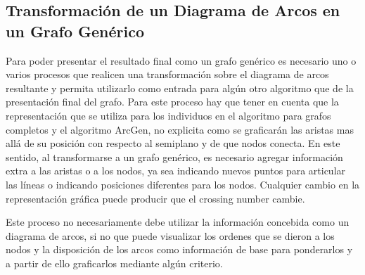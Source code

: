 \subsection{Transformación de un Diagrama de Arcos en un Grafo Genérico}
\label{sec:transformacion_generico}
Para poder presentar el resultado final como un grafo genérico es necesario uno o varios procesos que realicen una transformación sobre el diagrama de arcos resultante y permita utilizarlo como entrada para algún otro algoritmo que de la presentación final del grafo. Para este proceso hay que tener en cuenta que la representación que se utiliza para los individuos en el algoritmo para grafos completos y el algoritmo ArcGen, no explicita como se graficarán las aristas mas allá de su posición con respecto al semiplano y de que nodos conecta. En este sentido, al transformarse a un grafo genérico, es necesario agregar información extra a las aristas o a los nodos, ya sea indicando nuevos puntos para articular las líneas o indicando posiciones diferentes para los nodos. Cualquier cambio en la representación gráfica puede producir que el crossing number cambie.

Este proceso no necesariamente debe utilizar la información concebida como un diagrama de arcos, si no que puede visualizar los ordenes que se dieron a los nodos y la disposición de los arcos como información de base para ponderarlos y a partir de ello graficarlos mediante algún criterio.